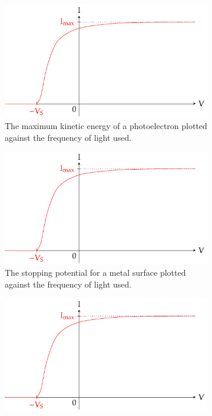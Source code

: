 \documentclass[oneside]{book}
\begin{document}
\begin{figure}[H]
    \centering
    \begin{subfigure}[c]{0.49\textwidth}
        \centering
        \includegraphics[width=\textwidth,page=2]{../images/The-Photoelectric-Effect/The-Photoelectric-Effect.pdf}
        \caption{ The maximum kinetic energy of a photoelectron plotted against the frequency of light used.}
    \end{subfigure}\hfill
    \begin{subfigure}[c]{0.49\textwidth}
        \centering
        \includegraphics[width=\textwidth,page=3]{../images/The-Photoelectric-Effect/The-Photoelectric-Effect.pdf}
        \caption{ The stopping potential for a metal surface plotted against the frequency of light used.}
    \end{subfigure}\hfill
    \begin{subfigure}[c]{0.49\textwidth}
        \centering
        \includegraphics[width=\textwidth,page=4]{../images/The-Photoelectric-Effect/The-Photoelectric-Effect.pdf}

\end{subfigure}
\end{figure}
\end{document}
